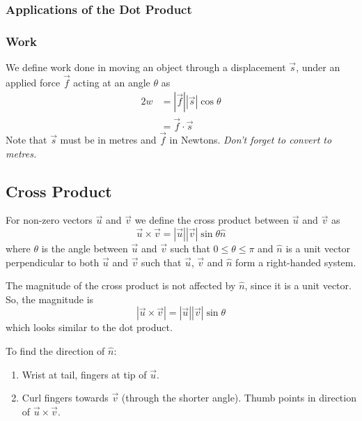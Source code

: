 \documentclass{article}
\theoremstyle{definition}
\numberwithin{equation}{section}
\begin{document}
\subsubsection{Applications of the Dot Product}
\subsubsection*{Work}
We define work done in moving an object through a displacement $\vec s$, under an applied force $\vec f$ acting at an angle $\theta$ as
\begin{alignat}{2}
	w &= |\vec f||\vec s|\cos \theta \\
		&= \vec f \cdot \vec s
\end{alignat}
Note that $\vec s$ must be in metres and $\vec f$ in Newtons. \emph{Don't forget to convert to metres.}

\subsection{Cross Product}
For non-zero vectors $\vec u$ and $\vec v$ we define the cross product between $\vec u$ and $\vec v$ as
\begin{equation}
	\vec u \times \vec v = |\vec u||\vec v|\sin \theta \hat n
\end{equation}
where $\theta$ is the angle between $\vec u$ and $\vec v$ such that $0 \le \theta \le \pi$ and $\hat n$ is a unit vector perpendicular to both $\vec u$ and $\vec v$ such that $\vec u$, $\vec v$ and $\hat n$ form a right-handed system.

The magnitude of the cross product is not affected by $\hat n$, since it is a unit vector. So, the magnitude is
\begin{equation}
	|\vec u \times \vec v| = |\vec u||\vec v|\sin \theta
\end{equation}
which looks similar to the dot product.

\bigskip \noindent
To find the direction of $\hat n$:
\begin{enumerate}
	\item Wrist at tail, fingers at tip of $\vec u$.
	\item Curl fingers towards $\vec v$ (through the shorter angle). Thumb points in direction of $\vec u \times \vec v$.
\end{enumerate}
\end{document}

